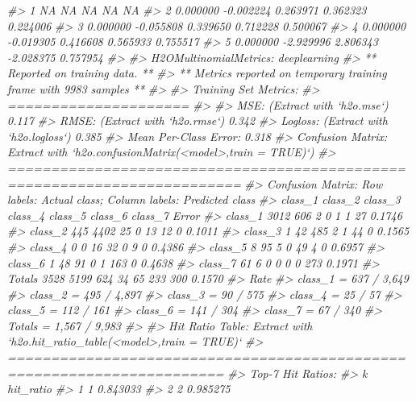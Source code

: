 \documentclass[]{book}
\newenvironment{Shaded}{\begin{snugshade}}{\end{snugshade}}
\newcommand{\CommentTok}[1]{\textcolor[rgb]{0.56,0.35,0.01}{\textit{#1}}}
\begin{document}
\begin{Shaded}
\begin{Highlighting}[]
{{{{{{\CommentTok{#> 1       NA          NA         NA        NA       NA}
\CommentTok{#> 2 0.000000   -0.002224   0.263971  0.362323 0.224006}
\CommentTok{#> 3 0.000000   -0.055808   0.339650  0.712228 0.500067}
\CommentTok{#> 4 0.000000   -0.019305   0.416608  0.565933 0.755517}
\CommentTok{#> 5 0.000000   -2.929996   2.806343 -2.028375 0.757954}
\CommentTok{#> }
\CommentTok{#> H2OMultinomialMetrics: deeplearning}
\CommentTok{#> ** Reported on training data. **}
\CommentTok{#> ** Metrics reported on temporary training frame with 9983 samples **}
\CommentTok{#> }
\CommentTok{#> Training Set Metrics: }
\CommentTok{#> =====================}
\CommentTok{#> }
\CommentTok{#> MSE: (Extract with `h2o.mse`) 0.117}
\CommentTok{#> RMSE: (Extract with `h2o.rmse`) 0.342}
\CommentTok{#> Logloss: (Extract with `h2o.logloss`) 0.385}
\CommentTok{#> Mean Per-Class Error: 0.318}
\CommentTok{#> Confusion Matrix: Extract with `h2o.confusionMatrix(<model>,train = TRUE)`)}
\CommentTok{#> =========================================================================}
\CommentTok{#> Confusion Matrix: Row labels: Actual class; Column labels: Predicted class}
\CommentTok{#>         class_1 class_2 class_3 class_4 class_5 class_6 class_7  Error}
\CommentTok{#> class_1    3012     606       2       0       1       1      27 0.1746}
\CommentTok{#> class_2     445    4402      25       0      13      12       0 0.1011}
\CommentTok{#> class_3       1      42     485       2       1      44       0 0.1565}
\CommentTok{#> class_4       0       0      16      32       0       9       0 0.4386}
\CommentTok{#> class_5       8      95       5       0      49       4       0 0.6957}
\CommentTok{#> class_6       1      48      91       0       1     163       0 0.4638}
\CommentTok{#> class_7      61       6       0       0       0       0     273 0.1971}
\CommentTok{#> Totals     3528    5199     624      34      65     233     300 0.1570}
\CommentTok{#>                    Rate}
\CommentTok{#> class_1 =   637 / 3,649}
\CommentTok{#> class_2 =   495 / 4,897}
\CommentTok{#> class_3 =      90 / 575}
\CommentTok{#> class_4 =       25 / 57}
\CommentTok{#> class_5 =     112 / 161}
\CommentTok{#> class_6 =     141 / 304}
\CommentTok{#> class_7 =      67 / 340}
\CommentTok{#> Totals  = 1,567 / 9,983}
\CommentTok{#> }
\CommentTok{#> Hit Ratio Table: Extract with `h2o.hit_ratio_table(<model>,train = TRUE)`}
\CommentTok{#> =======================================================================}
\CommentTok{#> Top-7 Hit Ratios: }
\CommentTok{#>   k hit_ratio}
\CommentTok{#> 1 1  0.843033}
\CommentTok{#> 2 2  0.985275}
}}}}}}
\end{Highlighting}
\end{Shaded}
\end{document}
